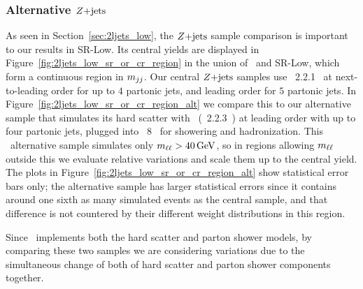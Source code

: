 \subsubsection{Alternative \texorpdfstring{$\zjets$}{Z+jets}}
\label{sec:2ljets_zjets_alt}
As seen in Section~\ref{sec:2ljets_low}, the $\zjets$ sample comparison is
important to our results in SR-Low.
Its central yields are displayed in Figure~\ref{fig:2ljets_low_sr_or_cr_region}
in the union of \crz\ and SR-Low, which form a continuous region in $\mjj$.
Our central $\zjets$ samples use \sherpa~2.2.1~\cite{
Bothmann:2019yzt,
Gleisberg:2008ta,
ATL-PHYS-PUB-2016-003
}
at next-to-leading order for up to $4$ partonic jets, and leading order for
$5$ partonic jets.
In Figure~\ref{fig:2ljets_low_sr_or_cr_region_alt} we compare this to our
alternative sample that simulates its hard scatter
with \madgraph\ (\amcatnlo~2.2.3~\cite{Alwall:2014hca}) at leading order with
up to four partonic jets, plugged into \pythia~8~\cite{Sjostrand:2014zea} for
showering and hadronization.
This \madgraph\ alternative sample simulates only $\mll > 40\,\eV[G]$, so in
regions allowing $\mll$ outside this we evaluate relative variations and
scale them up to the central yield.
The plots in Figure~\ref{fig:2ljets_low_sr_or_cr_region_alt} show statistical
error bars only; the alternative sample has larger statistical errors since
it contains around one sixth as many simulated events as the central sample,
and that difference is not countered by their different weight distributions
in this region.

Since \sherpa\ implements both the hard scatter and parton shower models, by
comparing these two samples we are considering variations due to the
simultaneous change of both of hard scatter and parton shower components
together.

